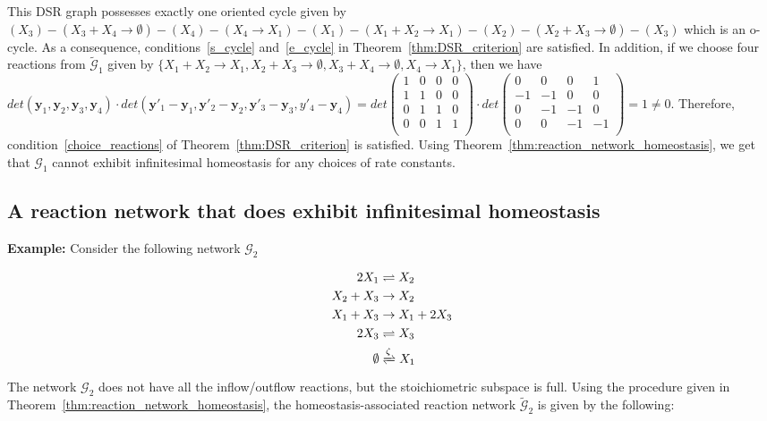 \documentclass[11pt]{article}
\theoremstyle{plain}
\theoremstyle{definition}
\theoremstyle{remark}
\newcommand\y{\boldsymbol{y}}
\newcommand\GG{\mathcal{G}}
\begin{document}
This DSR graph possesses exactly one oriented cycle given by $(X_3)-(X_3 + X_4\rightarrow \emptyset)-(X_4)-(X_4 \rightarrow X_1)-(X_1)-(X_1 + X_2 \rightarrow X_1)-(X_2)-(X_2 + X_3\rightarrow \emptyset) - (X_3)$ which is an o-cycle. As a consequence, conditions~\ref{s_cycle} and~\ref{e_cycle} in Theorem~\ref{thm:DSR_criterion} are satisfied. In addition, if we choose four reactions from $\tilde{\mathcal{G}}_1$ given by $\{X_1 + X_2 \rightarrow X_1,X_2 + X_3 \rightarrow \emptyset, X_3 + X_4 \rightarrow  \emptyset, X_4 \rightarrow X_1\}$, then we have $det(\y_1,\y_2,\y_3,\y_4)\cdot det(\y'_1-\y_1,\y'_2-\y_2,\y'_3-\y_3,y'_4-\y_4) = det \begin{pmatrix} 
1  &  0  &  0  & 0 \\
1  &  1  &  0  & 0 \\
0  &  1  &  1  & 0 \\
0  &  0  &  1  & 1 \\
\end{pmatrix}\cdot
det\begin{pmatrix} 
0  &   0  &  0  & 1 \\
-1 &  -1  &  0  & 0 \\
0  &  -1  & -1  & 0 \\
0  &   0  & -1  & -1 \\
\end{pmatrix}=1\neq 0$. Therefore, condition~\ref{choice_reactions} of Theorem~\ref{thm:DSR_criterion} is satisfied. Using Theorem~\ref{thm:reaction_network_homeostasis}, we get that $\mathcal{G}_1$ cannot exhibit infinitesimal homeostasis for any choices of rate constants.


\subsection{A reaction network that does exhibit infinitesimal homeostasis}


\textbf{Example:} Consider the following network $\GG_2$


\begin{eqnarray}
\begin{split}
2X_1 &\rightleftharpoons X_2 \\
X_2 + X_3 &\rightarrow X_2 \\
X_1 + X_3 &\rightarrow X_1 + 2X_3 \\
2X_3 &\rightleftharpoons X_3 \\
\emptyset &\xrightleftharpoons[]{\zeta} X_1 \\
\end{split}
\end{eqnarray}
%
The network $\GG_2$ does not have all the inflow/outflow reactions, but the stoichiometric subspace is full. Using the procedure given in Theorem~\ref{thm:reaction_network_homeostasis}, the homeostasis-associated reaction network $\tilde{\GG}_2$ is given by the following:
\end{document}
